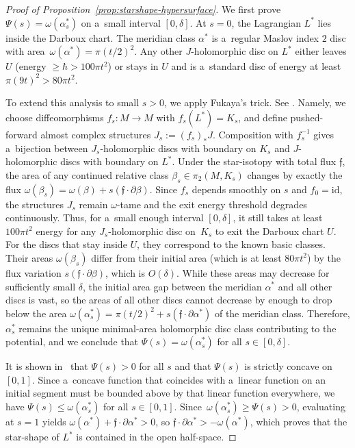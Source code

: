 \documentclass[pdftex]{sigma}
\numberwithin{equation}{section}
\theoremstyle{definition}
\begin{document}
\begin{proof}[Proof of Proposition~\ref{prop:starshape-hypersurface}]
 We first prove $\Psi(s) = \omega(\alpha^*_s)$ on a~small interval $[0,\delta]$.
 At $s=0$, the Lagrangian $L^*$ lies inside the Darboux chart. The meridian class $\alpha^*$ is a~regular Maslov index $2$ disc with area~${\omega(\alpha^*) = \pi (t/2)^2}$. Any other $J$-holomorphic disc on $L^*$ either leaves $U$ \big(energy $\ge \hbar > 100\pi t^2$\big) or stays in $U$ and is a~standard disc of energy at least $\pi(9t)^2 > 80\pi t^2$.

 To extend this analysis to small $s>0$, we apply Fukaya's trick. See \cite[Section~2.1]{STVFluxShape}.
 Namely, we choose diffeomorphisms $f_s\colon M\to M$ with $f_s(L^*)=K_s$, and define pushed-forward almost complex structures $J_s:=(f_s)_*J$.
 Composition with $f_s^{-1}$ gives a~bijection between $J_s$-holomorphic discs with boundary on $K_s$ and $J$-holomorphic discs with boundary on $L^*$. Under the star-isotopy with total flux $\mathfrak f$, the area of any continued relative class $\beta_s\in\pi_2(M,K_s)$ changes by exactly the flux
$
 \omega(\beta_s)=\omega(\beta)+s(\mathfrak f\cdot\partial\beta)$.
 Since $f_s$ depends smoothly on $s$ and $f_0=\mathrm{id}$, the structures $J_s$ remain $\omega$-tame and the exit energy threshold degrades continuously. Thus, for a~small enough interval $[0,\delta]$, it still takes at least $100\pi t^2$ energy for any $J_s$-holomorphic disc on~$K_s$ to exit the Darboux chart $U$. For the discs that stay inside $U$, they correspond to the known basic classes. Their areas $\omega(\beta_s)$ differ from their initial area (which is at least $80\pi t^2$) by the flux variation $s(\mathfrak f\cdot\partial\beta)$, which is $O(\delta)$.
 While these areas may decrease for sufficiently small $\delta$, the initial area gap between the meridian $\alpha^*$ and all other discs is vast, so the areas of all other discs cannot decrease by enough to drop below the area $\omega(\alpha^*_s) = \pi (t/2)^2 + s(\mathfrak f\cdot\partial\alpha^*)$ of the meridian class.
 Therefore, $\alpha^*_s$ remains the unique minimal-area holomorphic disc class contributing to the potential, and we conclude that $\Psi(s)=\omega(\alpha^*_s)$ for all $s\in[0,\delta]$.

 It is shown in~\cite{STVFluxShape} that $\Psi(s) > 0$ for all $s$ and that $\Psi(s)$ is strictly concave on $[0,1]$. Since a~concave function that coincides with a~linear function on an initial segment must be bounded above by that linear function everywhere, we have $\Psi(s) \le \omega(\alpha^*_s)$ for all $s\in [0,1]$.
 Since~${\omega(\alpha^*_s) \ge \Psi(s) > 0}$, evaluating at $s=1$ yields $\omega(\alpha^*) + \mathfrak f\cdot\partial\alpha^* > 0$, so
$
 \mathfrak f\cdot\partial\alpha^*>-\omega(\alpha^*)$,
 which proves that the star-shape of $L^*$ is contained in the open half-space.


\end{proof}
\end{document}
